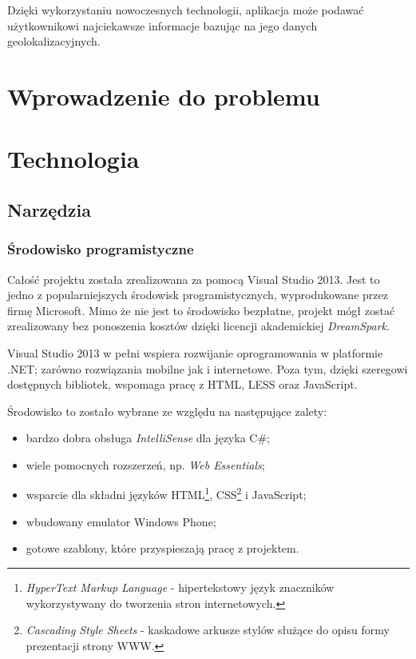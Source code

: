 \documentclass{book}
\begin{document}
		Dzięki wykorzystaniu nowoczesnych technologii, aplikacja może podawać użytkownikowi najciekawsze informacje bazując na jego danych geolokalizacyjnych. 
	
	
	\chapter{Wprowadzenie do problemu}
	
	\chapter{Technologia}
		\section{Narzędzia}		
			\subsection{Środowisko programistyczne}
				
			Całość projektu została zrealizowana za pomocą Visual Studio 2013. Jest to jedno z popularniejszych środowisk programistycznych, wyprodukowane przez firmę Microsoft. Mimo że nie jest to środowisko bezpłatne, projekt mógł zostać zrealizowany bez ponoszenia kosztów dzięki licencji akademickiej \textit{DreamSpark}. 
			
			Visual Studio 2013 w pełni wspiera rozwijanie oprogramowania w platformie .NET; zarówno rozwiązania mobilne jak i internetowe. Poza tym, dzięki szeregowi dostępnych bibliotek, wspomaga pracę z HTML, LESS oraz JavaScript.
			
			Środowisko to zostało wybrane ze względu na następujące zalety:
			\begin{itemize}
				\item bardzo  dobra obsługa \textit{IntelliSense} dla języka C\#;
				\item wiele pomocnych rozszerzeń, np. \textit{Web Essentials};
				\item wsparcie dla składni języków HTML\footnote{\emph{HyperText Markup Language} - hipertekstowy język znaczników wykorzystywany do tworzenia stron internetowych.}, CSS\footnote{\emph{Cascading Style Sheets} - kaskadowe arkusze stylów służące do opisu formy prezentacji strony WWW.} i JavaScript;
				\item wbudowany emulator Windows Phone;
				\item gotowe szablony, które przyspieszają pracę z projektem.
			\end{itemize}
			
\end{document}
